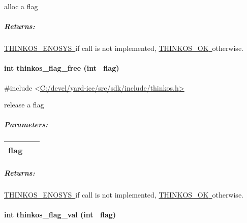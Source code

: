 {{alloc a flag }

{}

\subparagraph{\texorpdfstring{{Returns:}}{Returns:}}\label{returns-36}

{\protect\hyperlink{h.3s49zyc}{THINKOS\_ENOSYS}}{\protect\hyperlink{h.3s49zyc}{~}}{if
call is not implemented,
}{\protect\hyperlink{h.2fk6b3p}{THINKOS\_OK}}{\protect\hyperlink{h.2fk6b3p}{~}}{otherwise.
}

\paragraph{\texorpdfstring{{int thinkos\_flag\_free (int
~flag)}}{int thinkos\_flag\_free (int ~flag)}}\label{int-thinkos_flag_free-int-flag}

{}

{\#include
\textless{}}{\protect\hyperlink{h.pkwqa1}{C:/devel/yard-ice/src/sdk/include/thinkos.h}}{\protect\hyperlink{h.pkwqa1}{\textgreater{}}}

{release a flag }

{}

\subparagraph{\texorpdfstring{{Parameters:}}{Parameters:}}\label{parameters-33}

\protect\hypertarget{t.383f7e723be615a1ab251cbb171dc44f8c48c9f4}{}{}\protect\hypertarget{t.33}{}{}

\begin{longtable}[]{@{}ll@{}}
\toprule
\begin{minipage}[t]{0.47\columnwidth}\raggedright\strut
{flag}{~}\strut
\end{minipage} & \begin{minipage}[t]{0.47\columnwidth}\raggedright\strut
{}\strut
\end{minipage}\tabularnewline
\bottomrule
\end{longtable}

\subparagraph{\texorpdfstring{{Returns:}}{Returns:}}\label{returns-37}

{\protect\hyperlink{h.3s49zyc}{THINKOS\_ENOSYS}}{\protect\hyperlink{h.3s49zyc}{~}}{if
call is not implemented,
}{\protect\hyperlink{h.2fk6b3p}{THINKOS\_OK}}{\protect\hyperlink{h.2fk6b3p}{~}}{otherwise.
}

\paragraph{\texorpdfstring{{int thinkos\_flag\_val (int
~flag)}}{int thinkos\_flag\_val (int ~flag)}}\label{int-thinkos_flag_val-int-flag}

}
